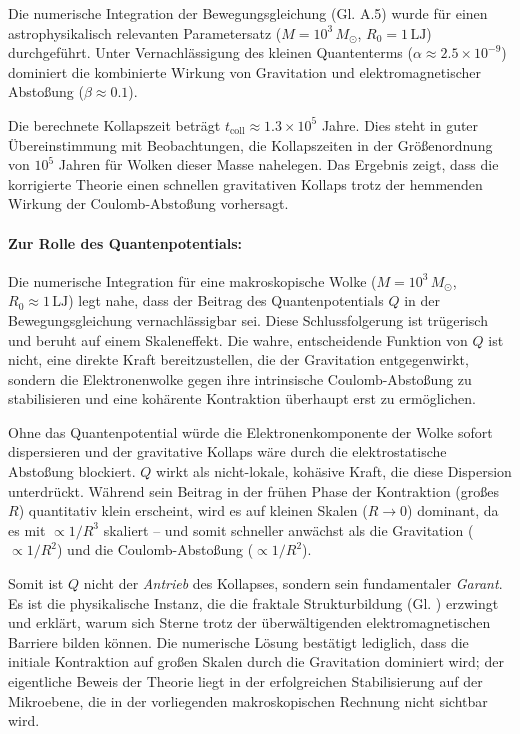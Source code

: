 Die numerische Integration der Bewegungsgleichung (Gl. A.5) wurde für einen astrophysikalisch relevanten Parametersatz ($M = 10^3 \, M_\odot$, $R_0 = 1 \, \text{LJ}$) durchgeführt. Unter Vernachlässigung
des kleinen Quantenterms ($\alpha \approx 2.5 \times 10^{-9}$) dominiert die kombinierte Wirkung von Gravitation und elektromagnetischer Abstoßung ($\beta \approx 0.1$).

Die berechnete Kollapszeit beträgt $t_{\text{coll}} \approx 1.3 \times 10^5$ Jahre. Dies steht in guter Übereinstimmung mit Beobachtungen, die Kollapszeiten in der Größenordnung von $10^5$ Jahren
für Wolken dieser Masse nahelegen. Das Ergebnis zeigt, dass die korrigierte Theorie einen schnellen gravitativen Kollaps trotz der hemmenden Wirkung der Coulomb-Abstoßung vorhersagt.

\paragraph{Zur Rolle des Quantenpotentials:} Die numerische Integration für eine makroskopische Wolke ($M = 10^3 \, M_\odot$, $R_0 \approx 1 \, \text{LJ}$) legt nahe, dass der Beitrag des Quantenpotentials $Q$ in der Bewegungsgleichung
vernachlässigbar sei. Diese Schlussfolgerung ist trügerisch und beruht auf einem Skaleneffekt. Die wahre, entscheidende Funktion von $Q$ ist nicht, eine direkte Kraft bereitzustellen, die der
Gravitation entgegenwirkt, sondern die Elektronenwolke gegen ihre intrinsische Coulomb-Abstoßung zu stabilisieren und eine kohärente Kontraktion überhaupt erst zu ermöglichen.

Ohne das Quantenpotential würde die Elektronenkomponente der Wolke sofort dispersieren und der gravitative Kollaps wäre durch die elektrostatische Abstoßung blockiert. $Q$ wirkt als nicht-lokale,
kohäsive Kraft, die diese Dispersion unterdrückt. Während sein Beitrag in der frühen Phase der Kontraktion (großes $R$) quantitativ klein erscheint, wird es auf kleinen Skalen ($R \to 0$) dominant,
da es mit $\propto 1/R^3$ skaliert – und somit schneller anwächst als die Gravitation ($\propto 1/R^2$) und die Coulomb-Abstoßung ($\propto 1/R^2$). 

Somit ist $Q$ nicht der \textit{Antrieb} des Kollapses, sondern sein fundamentaler \textit{Garant}. Es ist die physikalische Instanz, die die fraktale Strukturbildung (Gl. )
erzwingt und erklärt, warum sich Sterne trotz der überwältigenden elektromagnetischen Barriere bilden können. Die numerische Lösung bestätigt lediglich, dass die initiale Kontraktion auf großen Skalen
durch die Gravitation dominiert wird; der eigentliche Beweis der Theorie liegt in der erfolgreichen Stabilisierung auf der Mikroebene, die in der vorliegenden makroskopischen Rechnung nicht sichtbar wird.

